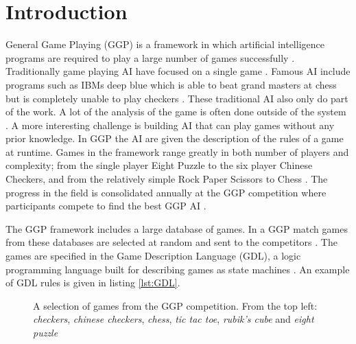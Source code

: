 \chapter{Introduction}\label{ch:intro}
General Game Playing (GGP) is a framework in which artificial intelligence programs are required to play a large number of games successfully \cite{Genesereth/GGPOverview}.
Traditionally game playing AI have focused on a single game \cite{AlphaGo,DeepBlue,Schaeffer/Checkers,Tesauro/Backgammon}. Famous AI include programs such as IBMs deep blue which is able to beat grand masters at chess but is completely unable to play checkers \cite{DeepBlue}. These traditional AI also only do part of the work. A lot of the analysis of the game is often done outside of the system \cite{Schaeffer/Checkers}. A more interesting challenge is building AI that can play games without any prior knowledge. In GGP the AI are given the description of the rules of a game at runtime. Games in the framework range greatly in both number of players and complexity; from the single player Eight Puzzle to the six player Chinese Checkers, and from the relatively simple Rock Paper Scissors to Chess  \cite{GGP-Website}. The progress in the field is consolidated annually at the GGP competition where participants compete to find the best GGP AI \cite{Genesereth/GGPOverview}.

The GGP framework includes a large database of games. In a GGP match games from these databases are selected at random and sent to the competitors \cite{Genesereth/GGPOverview}. The games are specified in the Game Description Language (GDL), a logic programming language built for describing games as state machines \cite{GDL_Spec}. An example of GDL rules is given in listing \ref{lst:GDL}.


\begin{figure}[ht]
	\centering
	\caption{A selection of games from the GGP competition. From the top left: \textit{checkers}, \textit{chinese checkers}, \textit{chess}, \textit{tic tac toe}, \textit{rubik's cube} and \textit{eight puzzle}}
\end{figure}




